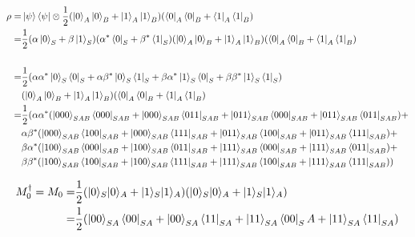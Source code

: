 \documentclass[12pt]{article}
\begin{document}
\begin{enumerate}
          \begin{align*}
              \rho  = & \ket{\psi}\bra{\psi}\otimes\frac{1}{2}(\ket{0}_A\ket{0}_B+\ket{1}_A\ket{1}_B)(\bra{0}_A\bra{0}_B+\bra{1}_A\bra{1}_B)                                              \\
              =       & \frac{1}{2}(\alpha\ket{0}_S + \beta\ket{1}_S)(\alpha^*\bra{0}_S + \beta^*\bra{1}_S)(\ket{0}_A\ket{0}_B+\ket{1}_A\ket{1}_B)(\bra{0}_A\bra{0}_B+\bra{1}_A\bra{1}_B) \\                                                          \\
              =       & \frac{1}{2}(\alpha\alpha^*\ket{0}_S\bra{0}_S+\alpha\beta^*\ket{0}_S\bra{1}_S+\beta\alpha^*\ket{1}_S\bra{0}_S+\beta\beta^*\ket{1}_S\bra{1}_S)                      \\
                      & (\ket{0}_A\ket{0}_B+\ket{1}_A\ket{1}_B)(\bra{0}_A\bra{0}_B+\bra{1}_A\bra{1}_B)                                                                                    \\
              =       & \frac{1}{2}(\alpha\alpha^*(\ket{000}_{SAB}\bra{000}_{SAB}+\ket{000}_{SAB}\bra{011}_{SAB}+\ket{011}_{SAB}\bra{000}_{SAB}+\ket{011}_{SAB}\bra{011}_{SAB})+          \\
                      & \alpha\beta^*(\ket{000}_{SAB}\bra{100}_{SAB}+\ket{000}_{SAB}\bra{111}_{SAB}+\ket{011}_{SAB}\bra{100}_{SAB}+\ket{011}_{SAB}\bra{111}_{SAB})+                       \\
                      & \beta\alpha^*(\ket{100}_{SAB}\bra{000}_{SAB}+\ket{100}_{SAB}\bra{011}_{SAB}+\ket{111}_{SAB}\bra{000}_{SAB}+\ket{111}_{SAB}\bra{011}_{SAB})+                       \\
                      & \beta\beta^*(\ket{100}_{SAB}\bra{100}_{SAB}+\ket{100}_{SAB}\bra{111}_{SAB}+\ket{111}_{SAB}\bra{100}_{SAB}+\ket{111}_{SAB}\bra{111}_{SAB}))                        \\
          \end{align*}


          \begin{align*}
              M_0^\dagger=M_0 = & \frac{1}{2}(|0\rangle_S|0\rangle_A + |1\rangle_S|1\rangle_A)(|0\rangle_S|0\rangle_A + |1\rangle_S|1\rangle_A)          \\
              =                 & \frac{1}{2}(\ket{00}_{SA}\bra{00}_{SA}+\ket{00}_{SA}\bra{11}_{SA}+\ket{11}_{SA}\bra{00}_SA+\ket{11}_{SA}\bra{11}_{SA}) \\
          \end{align*}


\end{enumerate}
\end{document}
